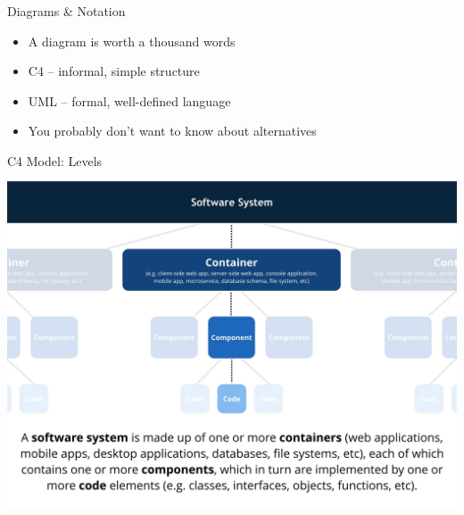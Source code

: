 \documentclass{slide}
\begin{document}
\begin{frame}{Diagrams \& Notation}

\Large{
\begin{itemize}
    \item<1-> A  diagram is worth a thousand words
    \vspace{5mm}
    \item<2-> C4 -- informal, simple structure \cite{brown2022c4}
    \vspace{2mm}
    \item<2-> UML -- formal, well-defined language \cite{uml}
    \vspace{3mm}
    \item<2-> You probably don't want to know about alternatives
\end{itemize}
}

\end{frame}


\begin{frame}{C4 Model: Levels}
	\centering
    \includegraphics[trim=0 50 0 0,clip,width=0.85\paperwidth]{../../notes/views/images/c4_terminology.jpg}
\end{frame}
\end{document}
